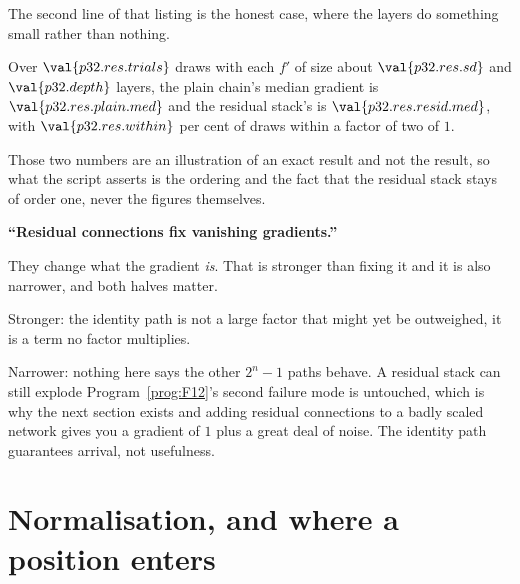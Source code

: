 
\begin{fr}
The second line of that listing is the honest case, where the layers do
something small rather than nothing.

Over $\val{p32.res.trials}$ draws with each $f'$ of size about
$\val{p32.res.sd}$ and $\val{p32.depth}$ layers, the plain chain's median
gradient is $\val{p32.res.plain.med}$ and the residual stack's is
$\val{p32.res.resid.med}$, with $\val{p32.res.within}$ per cent of draws
within a factor of two of $1$.

Those two numbers are an illustration of an exact result and not the result,
so what the script asserts is the ordering and the fact that the residual
stack stays of order one, never the figures themselves.

\begin{trapbox}
\textbf{\enquote{Residual connections fix vanishing gradients.}}

They change what the gradient \emph{is}. That is stronger than fixing it and
it is also narrower, and both halves matter.

Stronger: the identity path is not a large factor that might yet be
outweighed, it is a term no factor multiplies.

Narrower: nothing here says the other $2^{n} - 1$ paths behave. A residual
stack can still explode \dash{} Program~\ref{prog:F12}'s second failure mode
is untouched, which is why the next section exists \dash{} and adding
residual connections to a badly scaled network gives you a gradient of $1$
plus a great deal of noise. The identity path guarantees arrival, not
usefulness.
\end{trapbox}
\end{fr}


\section{Normalisation, and where a position enters}
\label{sec:P32-norm}

